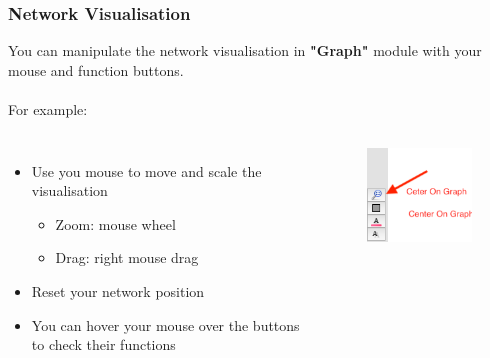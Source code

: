 \documentclass[10pt]{beamer}
\begin{document}
\begin{frame}
\frametitle{Network Visualisation}
You can manipulate the network visualisation in \textbf{"Graph"} module with your mouse and function buttons. \\~\\
For example:
\begin{columns}[c] 
\begin{itemize}
\item Use you mouse to move and scale the visualisation
	\begin{itemize}
		\item Zoom: mouse wheel
		\item Drag: right mouse drag
	\end{itemize}
\item Reset your network position
\item You can hover your mouse over the buttons to check their functions
\end{itemize}

\begin{figure}
\includegraphics[width=0.5\linewidth]{figures/reset_position.png}
\end{figure}

\end{columns}
\end{frame}
\end{document}
